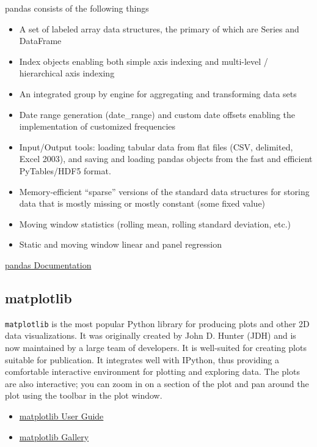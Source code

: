 \documentclass{article}
\begin{document}
pandas consists of the following things

\begin{itemize}
\itemsep1pt\parskip0pt
\item
  A set of labeled array data structures, the primary of which are
  Series and DataFrame
\item
  Index objects enabling both simple axis indexing and multi-level /
  hierarchical axis indexing
\item
  An integrated group by engine for aggregating and transforming data
  sets
\item
  Date range generation (date\_range) and custom date offsets enabling
  the implementation of customized frequencies
\item
  Input/Output tools: loading tabular data from flat files (CSV,
  delimited, Excel 2003), and saving and loading pandas objects from the
  fast and efficient PyTables/HDF5 format.
\item
  Memory-efficient ``sparse'' versions of the standard data structures
  for storing data that is mostly missing or mostly constant (some fixed
  value)
\item
  Moving window statistics (rolling mean, rolling standard deviation,
  etc.)
\item
  Static and moving window linear and panel regression
\end{itemize}

\href{http://pandas.pydata.org/pandas-docs/version/0.17.0/}{pandas
Documentation}

\subsection{matplotlib}\label{matplotlib}

\texttt{matplotlib} is the most popular Python library for producing
plots and other 2D data visualizations. It was originally created by
John D. Hunter (JDH) and is now maintained by a large team of
developers. It is well-suited for creating plots suitable for
publication. It integrates well with IPython, thus providing a
comfortable interactive environment for plotting and exploring data. The
plots are also interactive; you can zoom in on a section of the plot and
pan around the plot using the toolbar in the plot window.

\begin{itemize}
\itemsep1pt\parskip0pt
\item
  \href{http://matplotlib.org/1.4.3/users/index.html}{matplotlib User
  Guide}
\item
  \href{http://matplotlib.org/1.4.3/gallery.html}{matplotlib Gallery}
\end{itemize}
\end{document}
